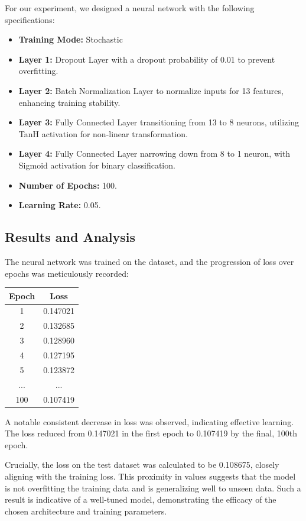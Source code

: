 \documentclass{article}
\begin{document}
For our experiment, we designed a neural network with the following specifications:

\begin{itemize}
    \item \textbf{Training Mode:} Stochastic
    \item \textbf{Layer 1:} Dropout Layer with a dropout probability of 0.01 to prevent overfitting.
    \item \textbf{Layer 2:} Batch Normalization Layer to normalize inputs for 13 features, enhancing training stability.
    \item \textbf{Layer 3:} Fully Connected Layer transitioning from 13 to 8 neurons, utilizing TanH activation for non-linear transformation.
    \item \textbf{Layer 4:} Fully Connected Layer narrowing down from 8 to 1 neuron, with Sigmoid activation for binary classification.
    \item \textbf{Number of Epochs:} 100.
    \item \textbf{Learning Rate:} 0.05.
\end{itemize}

\subsection{Results and Analysis}

The neural network was trained on the dataset, and the progression of loss over epochs was meticulously recorded:

\begin{center}
    \begin{tabular}{cc}
        \hline
        Epoch & Loss \\
        \hline
        1 & 0.147021 \\
        2 & 0.132685 \\
        3 & 0.128960 \\
        4 & 0.127195 \\
        5 & 0.123872 \\
        ... & ... \\
        100 & 0.107419 \\
        \hline
    \end{tabular}
\end{center}


A notable consistent decrease in loss was observed, indicating effective learning. The loss reduced from 0.147021 in the first epoch to 0.107419 by the final, 100th epoch. 

Crucially, the loss on the test dataset was calculated to be 0.108675, closely aligning with the training loss. This proximity in values suggests that the model is not overfitting the training data and is generalizing well to unseen data. Such a result is indicative of a well-tuned model, demonstrating the efficacy of the chosen architecture and training parameters.
\end{document}
